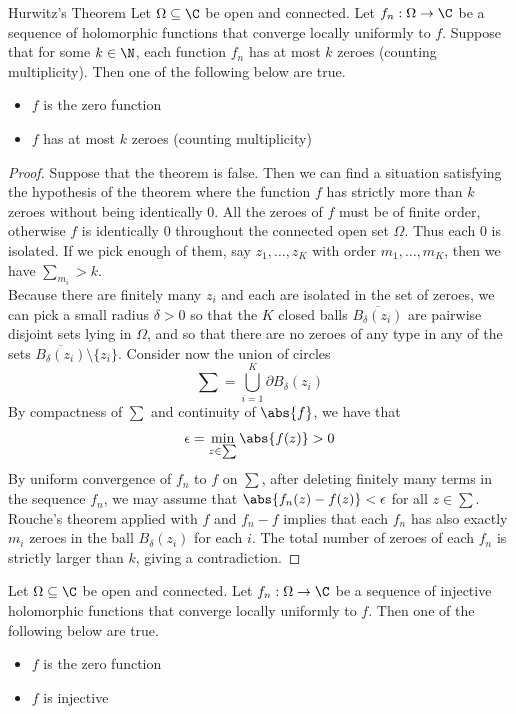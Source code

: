 \documentclass[a4paper]{article}
\begin{document}
\begin{thm}{Hurwitz's Theorem}{} Let $\Omega\subseteq\C$ be open and connected. Let $f_n:\Omega\to\C$ be a sequence of holomorphic functions that converge locally uniformly to $f$. Suppose that for some $k\in\N$, each function $f_n$ has at most $k$ zeroes (counting multiplicity). Then one of the following below are true. 
\begin{itemize}
\item $f$ is the zero function
\item $f$ has at most $k$ zeroes (counting multiplicity)
\end{itemize} 
\begin{proof}
Suppose that the theorem is false. Then we can find a situation satisfying the hypothesis of the theorem where the function $f$ has strictly more than $k$ zeroes without being identically $0$. All the zeroes of $f$ must be of finite order, otherwise $f$ is identically $0$ throughout the connected open set $\Omega$. Thus each $0$ is isolated. If we pick enough of them, say $z_1,\dots,z_K$ with order $m_1,\dots,m_K$, then we have $\sum_{m_i}>k$. \\

Because there are finitely many $z_i$ and each are isolated in the set of zeroes, we can pick a small radius $\delta>0$ so that the $K$ closed balls $\overline{B_\delta(z_i)}$ are pairwise disjoint sets lying in $\Omega$, and so that there are no zeroes of any type in any of the sets $\overline{B_\delta(z_i)}\setminus\{z_i\}$. Consider now the union of circles $$\sum=\bigcup_{i=1}^K\partial B_\delta(z_i)$$ By compactness of $\sum$ and continuity of $\abs{f}$, we have that $$\epsilon=\min_{z\in\sum}\abs{f(z)}>0$$ By uniform convergence of $f_n$ to $f$ on $\sum$, after deleting finitely many terms in the sequence $f_n$, we may assume that $\abs{f_n(z)-f(z)}<\epsilon$ for all $z\in\sum$. Rouche's theorem applied with $f$ and $f_n-f$ implies that each $f_n$ has also exactly $m_i$ zeroes in the ball $B_\delta(z_i)$ for each $i$. The total number of zeroes of each $f_n$ is strictly larger than $k$, giving a contradiction. 
\end{proof}
\end{thm}

\begin{crl}{}{}  Let $\Omega\subseteq\C$ be open and connected. Let $f_n:\Omega\to\C$ be a sequence of injective holomorphic functions that converge locally uniformly to $f$. Then one of the following below are true. 
\begin{itemize}
\item $f$ is the zero function
\item $f$ is injective
\end{itemize}
\end{crl}
\end{document}
